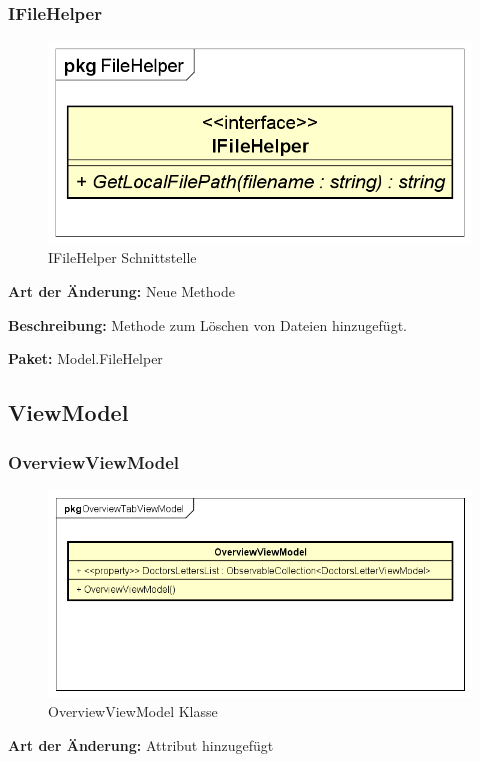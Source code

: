 \documentclass[a4paper]{scrreprt}
\begin{document}
\subsubsection{IFileHelper}
\begin{figure}[H]
\centering
\includegraphics[width=0.45\textheight]{graphics/Klassendiagramme/Model/IFileHelper.png}
\caption{IFileHelper Schnittstelle}
\end{figure}
\textbf{Art der Änderung:} Neue Methode

\textbf{Beschreibung:} Methode zum Löschen von Dateien hinzugefügt.

\textbf{Paket:} Model.FileHelper

\subsection{ViewModel}
\subsubsection{OverviewViewModel}
\begin{figure}[H]
\centering
\includegraphics[width=0.45\textheight]{graphics/Klassendiagramme/ViewModel/OverviewViewModel}
\caption{OverviewViewModel Klasse}
\end{figure}
\textbf{Art der Änderung:} Attribut hinzugefügt
\end{document}
